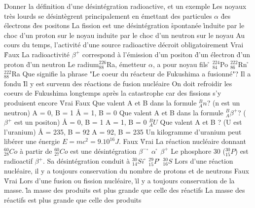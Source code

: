 \q
Donner la définition d'une désintégration radioactive, et un exemple
\q
Les noyaux très lourds se désintègrent principalement en émettant
\rv
des particules $\alpha$
\r
des électrons
\r
des positons
\q
La fission est une désintégration
\r
spontanée
\r
induite par le choc d'un proton sur le noyau
\rv
induite par le choc d'un neutron sur le noyau
\q
Au cours du temps, l'activité d'une source radioactive décroit obligatoirement
\rv
Vrai
\r
Faux
\q
La radioactivité $\beta^+$ correspond à l'émission
\rv
d'un positon
\r
d'un électron
\r
d'un proton
\r
d'un neutron
\q
Le radium$_{88}^{226}$Ra, émetteur $\alpha$, a pour noyau fils
\r
$_{84}^{224}$Po
\rv
$_{86}^{222}$Rn
\r
$_{88}^{222}$Ra
\q
Que signifie la phrase "Le coeur du réacteur de Fukushima a fusionné"?
\rv
Il a fondu
\r
Il y est survenu des réactions de fusion nucléaire
\q
On doit refroidir les coeurs de Fukushima longtemps après la catastrophe car des fissions s'y produisent encore
\r
Vrai
\rv
Faux
\q
Que valent A et B dans la formule $_A^Bn$? (n est un neutron)
\rv
A = 0, B = 1
\r
A = 1, B = 0
\q
Que valent A et B dans la formule $_A^B\beta^+$? ($\beta^+$ est un positon)
\r
A = 0, B = 1
\rv
A = 1, B = 0
\q
$_A^BU$
Que valent A et B ? (U est l'uranium)
\r
A = 235, B = 92
\rv
A = 92, B = 235
\q
Un kilogramme d'uranium peut libérer une énergie $E=mc^2=9.10^{16} J$.
\rv
Faux
\r
Vrai
\q
La réaction nucléaire donnant $_{28}^{60}Co$ à partir de $_{27}^{60}Co$ est une désintégration
\rv 
$\beta^-$
\r
$\alpha$
\r
$\beta^+$
\q
Le phosphore 30 ($_{15}^{30}P$) est radioactif $\beta^+$. Sa désintégration conduit à
\rv
$_{14}^{30}Si$
\r
$_{15}^{29}P$
\r
$_{16}^{30}S$
\q
Lors d'une réaction nucléaire, il y a toujours conservation du nombre de protons et de neutrons
\rv
Faux
\r
Vrai
\q
Lors d'une fusion ou fission nucléaire, 
\r
il y a toujours conservation de la masse.
\r
la masse des produits est plus grande que celle des réactifs
\rv
La masse des réactifs est plus grande que celle des produits


